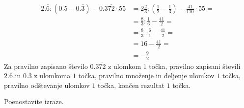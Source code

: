 \documentclass[addpoints]{exam}
\begin{document}
\begin{questions}
\begin{parts}
        \begin{solution}[4cm]
            \begin{align*}
                2.\overline{6}:(0.5-0.\overline{3})-0.3\overline{72}\cdot 55 &= 2\frac{2}{3}:(\frac{1}{2}-\frac{1}{3})-\frac{41}{110}\cdot 55= \\
                                                                            &= \frac{8}{3}:\frac{1}{6}-\frac{41}{2}= \\
                                                                            &= \frac{8}{3}\cdot \frac{6}{1}-\frac{41}{2}= \\
                                                                            &= 16-\frac{41}{2}= \\
                                                                            &= -\frac{9}{2}
            \end{align*}
            Za pravilno zapisano število $0.3\overline{72}$ z ulomkom $1$ točka, pravilno zapisani števili $2.\overline{6}$ in $0.\overline{3}$ z ulomkoma $1$ točka, pravilno množenje in deljenje ulomkov $1$ točka, pravilno odštevanje ulomkov $1$ točka, končen rezultat $1$ točka.
        \end{solution}

    \end{parts}






    \newpage


        \question
        Poenostavite izraze.
\end{questions}
\end{document}
